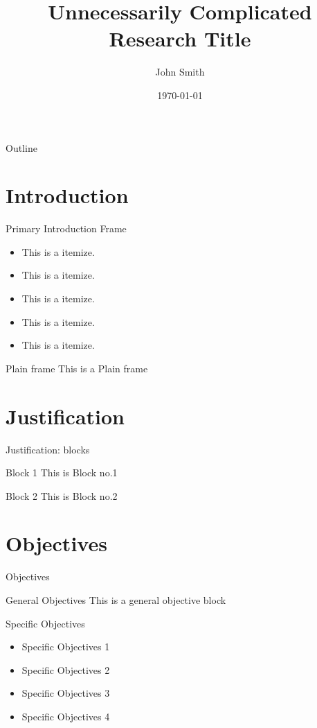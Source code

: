 \documentclass[9pt,aspectratio=169]{beamer}
\title{Unnecessarily Complicated Research Title} %
\author[Smith]{John Smith} %
\institute[McGill]{McGill University} %
\date[Conference Name]%
{\today}
\begin{document}
\begin{frame}
  \titlepage
\end{frame}

\begin{frame}{Outline}
  \tableofcontents
\end{frame}

\section{Introduction} 
\begin{frame}{Primary Introduction Frame}
  \begin{itemize}
    \item This is a itemize.
    \item This is a itemize.
    \item This is a itemize.
    \item This is a itemize.
    \item This is a itemize.
  \end{itemize}
\end{frame}

\begin{frame}{Plain frame}
    This is a Plain frame
\end{frame}

\section{Justification}
\begin{frame}{Justification: blocks}
  \begin{block}{Block 1}
  This is Block no.1
  \end{block}

  \begin{block}{Block 2}
  This is Block no.2
  \end{block}

\end{frame}

\section{Objectives}
\begin{frame}{Objectives}
  \begin{block}{General Objectives}
  This is a general objective block
  \end{block}

  \begin{block}{Specific Objectives}
  \begin{itemize}
      \item Specific Objectives 1
      \item Specific Objectives 2
      \item Specific Objectives 3
      \item Specific Objectives 4
  \end{itemize}
\end{block}

    
\end{frame}
\end{document}
